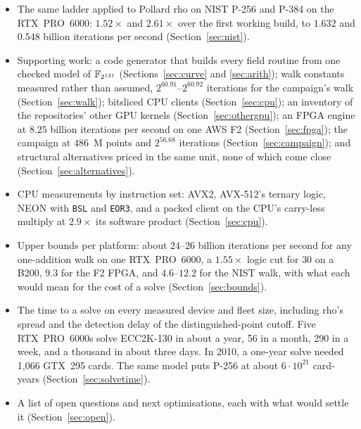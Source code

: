 \begin{itemize}[leftmargin=1.2em,itemsep=0.3em]
\item The same ladder applied to Pollard rho on NIST P-256 and P-384 on
  the RTX~PRO~6000: $1.52\times$ and $2.61\times$ over the first working
  build, to $1.632$ and $0.548$ billion iterations per second
  (Section~\ref{sec:nist}).
\item Supporting work: a code generator that builds every field routine
  from one checked model of $\mathbb{F}_{2^{131}}$
  (Sections~\ref{sec:curve} and \ref{sec:arith}); walk constants
  measured rather than assumed, $2^{60.91}$--$2^{60.92}$ iterations for
  the campaign's walk (Section~\ref{sec:walk}); bitsliced CPU clients
  (Section~\ref{sec:cpu}); an inventory of the repositories' other GPU
  kernels (Section~\ref{sec:othergpu}); an FPGA engine at $8.25$ billion
  iterations per second on one AWS F2 (Section~\ref{sec:fpga}); the
  campaign at $486$~M points and $2^{56.68}$ iterations
  (Section~\ref{sec:campaign}); and structural alternatives priced in
  the same unit, none of which come close
  (Section~\ref{sec:alternatives}).
\item CPU measurements by instruction set: AVX2, AVX-512's ternary
  logic, NEON with \texttt{BSL} and \texttt{EOR3}, and a packed client on
  the CPU's carry-less multiply at $2.9\times$ its software product
  (Section~\ref{sec:cpu}).
\item Upper bounds per platform: about $24$--$26$ billion iterations per
  second for any one-addition walk on one RTX~PRO~6000, a $1.55\times$
  logic cut for $30$ on a B200, $9.3$ for the F2 FPGA, and $4.6$--$12.2$ for
  the NIST walk, with what each would mean for the cost of a solve
  (Section~\ref{sec:bounds}).
\item The time to a solve on every measured device and fleet size,
  including rho's spread and the detection delay of the
  distinguished-point cutoff. Five RTX~PRO~6000s solve ECC2K-130 in
  about a year, 56 in a month, 290 in a week, and a thousand in about
  three days. In 2010, a one-year solve needed 1{,}066 GTX~295 cards. The
  same model puts P-256 at about $6\cdot10^{21}$ card-years
  (Section~\ref{sec:solvetime}).
\item A list of open questions and next optimisations, each with what
  would settle it (Section~\ref{sec:open}).
\end{itemize}

